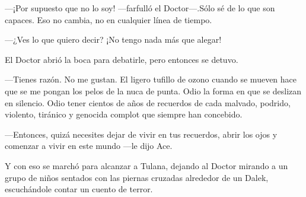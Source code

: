 ---¡Por supuesto que no lo soy! ---farfulló el Doctor---.Sólo
sé de lo que son capaces. Eso no cambia, no en cualquier línea de
tiempo.

---¿Ves lo que quiero decir? ¡No tengo nada más que alegar!

El Doctor abrió la boca para debatirle, pero entonces se detuvo.

---Tienes razón. No me gustan. El ligero tufillo de ozono cuando
se mueven hace que se me pongan los pelos de la nuca de punta. Odio la
forma en que se deslizan en silencio. Odio tener cientos de años de
recuerdos de cada malvado, podrido, violento, tiránico y genocida
complot que siempre han concebido.

---Entonces, quizá necesites dejar de vivir en tus recuerdos,
abrir los ojos y comenzar a vivir en este mundo ---le dijo Ace.

Y con eso se marchó para alcanzar a Tulana, dejando al Doctor
mirando a un grupo de niños sentados con las piernas cruzadas alrededor
de un Dalek, escuchándole contar un cuento de terror.